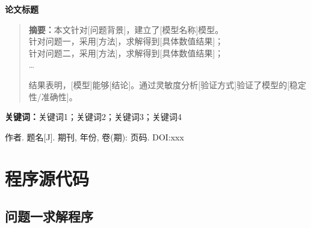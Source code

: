 \documentclass[12pt,a4paper]{ctexart}
\begin{document}
\thispagestyle{empty}

\newpage

\thispagestyle{empty}

\newpage

\setcounter{page}{1}  %

\begin{center}
    {\LARGE \textbf{论文标题}}
\end{center}

\vspace{1cm}

\begin{abstract}
\noindent
\textbf{摘要：}本文针对[问题背景]，建立了[模型名称]模型。\\
针对问题一，采用[方法]，求解得到[具体数值结果]；\\
针对问题二，采用[方法]，求解得到[具体数值结果]；\\
\ldots

结果表明，[模型]能够[结论]。通过灵敏度分析[验证方式]验证了模型的[稳定性/准确性]。
\end{abstract}

\vspace{0.5cm}
\noindent\textbf{关键词：}关键词1；关键词2；关键词3；关键词4
\newpage









\begin{thebibliography}{99}

 作者. 题名[J]. 期刊, 年份, 卷(期): 页码. DOI:xxx

\end{thebibliography}

\newpage
\appendix
\section{程序源代码}

\subsection{问题一求解程序}

\end{document}
